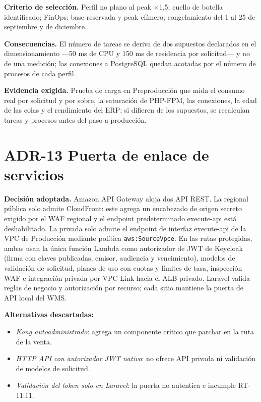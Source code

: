 \textbf{Criterio de selección.} Perfil no plano al peak $\times$1,5; cuello de botella identificado; FinOps: base reservada y peak efímero; congelamiento del 1 al 25 de septiembre y de diciembre.

\textbf{Consecuencias.} El número de tareas se deriva de dos supuestos declarados en el dimensionamiento ---50 ms de CPU y 150 ms de residencia por solicitud--- y no de una medición; las conexiones a PostgreSQL quedan acotadas por el número de procesos de cada perfil.

\textbf{Evidencia exigida.} Prueba de carga en Preproducción que mida el consumo real por solicitud y por sobre, la saturación de PHP-FPM, las conexiones, la edad de las colas y el rendimiento del ERP; si difieren de los supuestos, se recalculan tareas y procesos antes del paso a producción.

\section{ADR-13 \textperiodcentered{} Puerta de enlace de servicios}
\label{sub:adr-13}

\textbf{Decisión adoptada.} Amazon API Gateway aloja dos API REST. La regional pública solo admite CloudFront: este agrega un encabezado de origen secreto exigido por el WAF regional y el endpoint predeterminado execute-api está deshabilitado. La privada solo admite el endpoint de interfaz execute-api de la VPC de Producción mediante política \texttt{aws:SourceVpce}. En las rutas protegidas, ambas usan la única función Lambda como autorizador de JWT de Keycloak (firma con claves publicadas, emisor, audiencia y vencimiento), modelos de validación de solicitud, planes de uso con cuotas y límites de tasa, inspección WAF e integración privada por VPC Link hacia el ALB privado. Laravel valida reglas de negocio y autorización por recurso; cada sitio mantiene la puerta de API local del WMS.

\textbf{Alternativas descartadas:}

\begin{itemize}
  \item \emph{Kong autoadministrado}: agrega un componente crítico que parchar en la ruta de la venta.
  \item \emph{HTTP API con autorizador JWT nativo}: no ofrece API privada ni validación de modelos de solicitud.
  \item \emph{Validación del token solo en Laravel}: la puerta no autentica e incumple RT-11.11.
\end{itemize}

